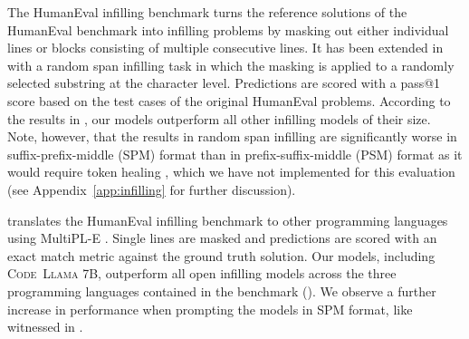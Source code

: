 \documentclass[10pt]{article}
\newcommand{\model}{\textsc{Code~Llama}\xspace}
\begin{document}
The HumanEval infilling benchmark \citep{fried2022incoder} turns the reference solutions of the HumanEval benchmark \citep{chen2021evaluating} into infilling problems by masking out either individual lines or blocks consisting of multiple consecutive lines. It has been extended in \citet{bavarian2022efficient} with a random span infilling task in which the masking is applied to a randomly selected substring at the character level. Predictions are scored with a pass@1 score based on the test cases of the original HumanEval problems. According to the results in , our models outperform all other infilling models of their size. Note, however, that the results in random span infilling are significantly worse in suffix-prefix-middle (SPM) format than in prefix-suffix-middle (PSM) format as it would require token healing \citep{microsoft2023guidance}, which we have not implemented for this evaluation (see Appendix~\ref{app:infilling} for further discussion).

\citet{allal2023santacoder} translates the HumanEval infilling benchmark to other programming languages using MultiPL-E \citep{cassano2022multiple}. Single lines are masked and predictions are scored with an exact match metric against the ground truth solution.
Our models, including \model 7B, outperform all open infilling models across the three programming languages contained in the benchmark (). We observe a further increase in performance when prompting the models in SPM format, like witnessed in \cite{bavarian2022efficient}. 
\end{document}
